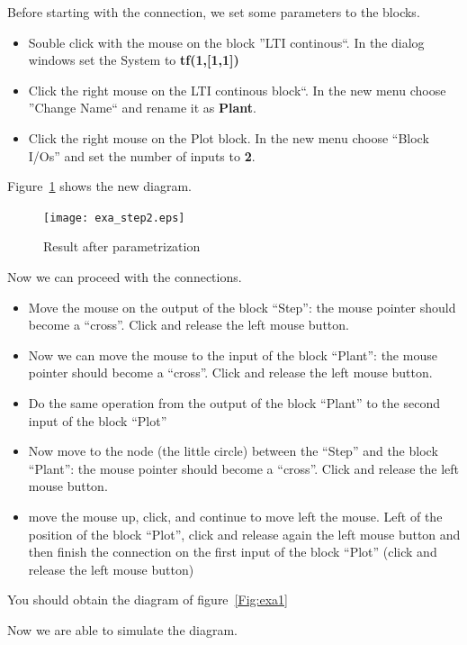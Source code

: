 Before starting with the connection, we set some parameters to the blocks.

\begin{itemize}
\item Souble click with the mouse on the block ''LTI continous``. In the dialog 
windows set the System to \textbf{tf(1,[1,1])}
\item Click the right mouse on the LTI continous block``. In the new menu 
choose ''Change Name`` and rename it as \textbf{Plant}.
\item Click the right mouse on the Plot block. In the new menu choose ``Block 
I/Os'' and set the number of inputs to \textbf{2}.
\end{itemize}

Figure~\ref{Fig:exa_step2} shows the new diagram.

\begin{figure}[htbp]	%
\centering
\texttt{[image: exa\_step2.eps]}
\caption{Result after parametrization}
\label{Fig:exa_step2}
\end{figure}

Now we can proceed with the connections.

\begin{itemize}
\item Move the mouse on the output of the block ``Step'': the mouse pointer 
should become a ``cross''. Click and release the left mouse button.
\item Now we can move the mouse to the input of the block ``Plant'': the mouse 
pointer should become a ``cross''. Click and release the left mouse button.
\item Do the same operation from the output of the block ``Plant'' to the 
second input of the block ``Plot''
\item Now move to the node (the little circle) between the ``Step'' and the 
block ``Plant'': the mouse 
pointer should become a ``cross''. Click and release the left mouse button.
\item move the mouse up, click, and continue to move left the mouse. Left of 
the position of the block ``Plot'', click and release again the left mouse 
button and then finish the connection on the first input of the block ``Plot'' 
(click and release the left mouse button)
\end{itemize}

You should obtain the diagram of figure~\ref{Fig:exa1}

Now we are able to simulate the diagram.

